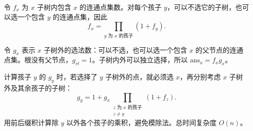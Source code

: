 令 $f_x$ 为 $x$ 子树内包含 $x$ 的连通点集数。对每个孩子 $y$，可以不选它的子树，也可以选一个包含 $y$ 的连通点集，因此
\[
f_x=\prod_{y\text{ 为 }x\text{ 的孩子}}(1+f_y).
\]

令 $g_x$ 表示 $x$ 子树外的选法数：可以不选，也可以选一个包含 $x$ 的父节点的连通点集。根没有父节点，$g_{rt}=1$。子树内外可以独立选择，所以 $\mathrm{ans}_x=f_xg_x$。

计算孩子 $y$ 的 $g_y$ 时，若选择了 $y$ 子树外的点，就必须选 $x$，再分别考虑 $x$ 子树外及其余孩子的子树：
\[
g_y=1+g_x\prod_{\substack{z\text{ 为 }x\text{ 的孩子}\\z\ne y}}(1+f_z).
\]
用前后缀积计算除 $y$ 以外各个孩子的乘积，避免模除法。总时间复杂度 $O(n)$。
